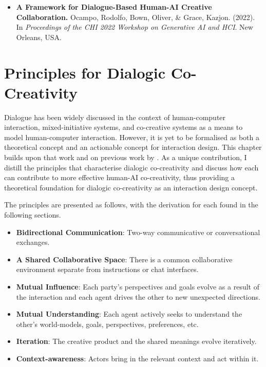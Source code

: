 \begin{itemize}
    \item \textbf{A Framework for Dialogue-Based Human-AI Creative Collaboration.} Ocampo, Rodolfo, Bown, Oliver, \& Grace, Kazjon. (2022). In \textit{Proceedings of the CHI 2022 Workshop on Generative AI and HCI}. New Orleans, USA.
\end{itemize}



\section{Principles for Dialogic Co-Creativity}

Dialogue has been widely discussed in the context of human-computer interaction, mixed-initiative systems, and co-creative systems \citep{Allen1999-sr, Yannakakis2014-zs, Deterding2017-wh} as a means to model human-computer interaction. However, it is yet to be formalised as both a theoretical concept and an actionable concept for interaction design. This chapter builds upon that work and on previous work by \citet{Bown2020-oc, Bown2024-yx}. As a unique contribution, I distill the principles that characterise dialogic co-creativity and discuss how each can contribute to more effective human-AI co-creativity, thus providing a theoretical foundation for dialogic co-creativity as an interaction design concept.

The principles are presented as follows, with the derivation for each found in the following sections. 


    \begin{itemize}
        \item \textbf{Bidirectional Communication}: Two-way communicative or conversational exchanges.
        \item \textbf{A Shared Collaborative Space}: There is a common collaborative environment separate from instructions or chat interfaces.
        \item \textbf{Mutual Influence}: Each party's perspectives and goals evolve as a result of the interaction and each agent drives the other to new unexpected directions.
        \item \textbf{Mutual Understanding}: Each agent actively seeks to understand the other's world-models, goals, perspectives, preferences, etc.
        \item \textbf{Iteration}: The creative product and the shared meanings evolve iteratively.
        \item \textbf{Context-awareness}: Actors bring in the relevant context and act within it.
    \end{itemize}


